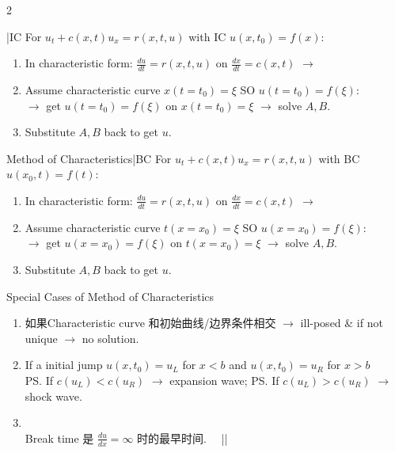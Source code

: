 \documentclass{note}
\begin{document}
\begin{multicols}{2}
{{    \begin{MyTh}{|IC} \tiny
        For $u_t + c(x,t)u_x = r(x,t,u)$ with IC $u(x,t_0)=f(x)$:
        \begin{enumerate}
            \item In characteristic form: $\tfrac{du}{dt}=r(x,t,u)$ on $\tfrac{dx}{dt}=c(x,t)$ \quad $\to$ 
            \item Assume characteristic curve  $x(t=t_0)=\xi$ SO $u(t=t_0)=f(\xi)$: \\
            $\to$ get $u(t=t_0)=f(\xi)$ on $x(t=t_0)=\xi$ \quad $\to$ solve $A,B$.
            \item Substitute $A,B$ back to get $u$.
        \end{enumerate}
    \end{MyTh}

    \begin{MyTh}{Method of Characteristics|BC} \tiny
        For $u_t + c(x,t)u_x = r(x,t,u)$ with BC $u(x_0,t)=f(t)$:
        \begin{enumerate}
            \item In characteristic form: $\tfrac{du}{dt}=r(x,t,u)$ on $\tfrac{dx}{dt}=c(x,t)$ \quad $\to$ 
            \item Assume characteristic curve  $t(x=x_0)=\xi$ SO $u(x=x_0)=f(\xi)$: \\
            $\to$ get $u(x=x_0)=f(\xi)$ on $t(x=x_0)=\xi$ \quad $\to$ solve $A,B$.
            \item Substitute $A,B$ back to get $u$.
        \end{enumerate}
    \end{MyTh}

    \begin{MyTh}{Special Cases of Method of Characteristics} \tiny
        \begin{enumerate}
            \item 如果Characteristic curve 和初始曲线/边界条件相交 $\to$ ill-posed \& if not unique $\to$ no solution.
            \item {} If a initial jump $u(x,t_0)=u_L$ for $x<b$ and $u(x,t_0)=u_R$ for $x>b$ \\
            \ps{If $c(u_L)<c(u_R)$} $\to$ expansion wave; \ps{If $c(u_L)>c(u_R)$} $\to$ shock wave.
            \item {}  \\
            \vspace{-2pt}
            Break time 是 $\frac{du}{dx}=\infty$  时的最早时间.  \ \ || \ \ 
        \end{enumerate}
    \end{MyTh}

}}
\end{multicols}
\end{document}
